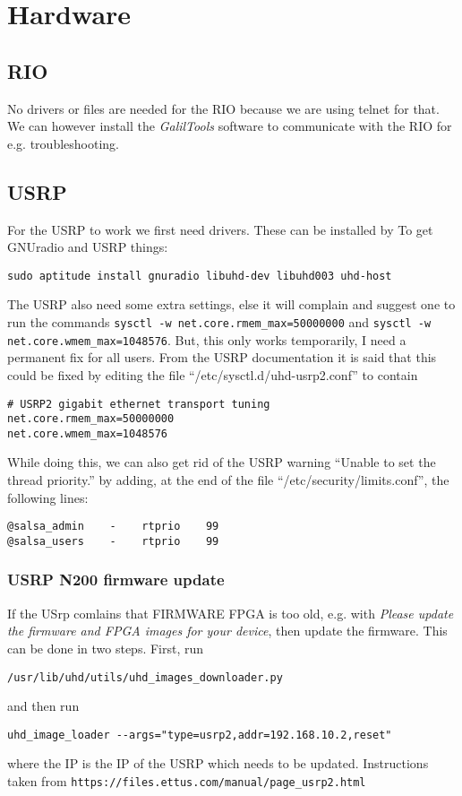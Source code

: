 \section{Hardware}
\subsection{RIO}
No drivers or files are needed for the RIO because we are using telnet for
that. We can however install the \emph{GalilTools} software to communicate
with the RIO for e.g. troubleshooting.

\subsection{USRP}
For the USRP to work we first need drivers. These can be installed by
To get GNUradio and USRP things: 
\begin{verbatim}
sudo aptitude install gnuradio libuhd-dev libuhd003 uhd-host
\end{verbatim}

The USRP also need some extra settings, else it will complain and suggest one
to run the commands 
\verb!sysctl -w net.core.rmem_max=50000000! and 
\verb!sysctl -w net.core.wmem_max=1048576!. But, this only works
temporarily, I need a permanent fix for all users. From the USRP documentation
it is said that this could be fixed by editing the file
“/etc/sysctl.d/uhd-usrp2.conf” to contain
\begin{verbatim}
# USRP2 gigabit ethernet transport tuning
net.core.rmem_max=50000000
net.core.wmem_max=1048576
\end{verbatim}
While doing this, we can also get rid of the USRP warning “Unable to set the
thread priority.” by adding, at the end of the file
“/etc/security/limits.conf”, the following lines: 
\begin{verbatim}
@salsa_admin    -    rtprio    99
@salsa_users    -    rtprio    99
\end{verbatim}

\subsubsection{USRP N200 firmware update}
If the USrp comlains that FIRMWARE FPGA is too old, e.g. with \emph{Please update the firmware and FPGA images for your device}, then update the firmware. This can be done in two steps. First, run
\begin{verbatim}
/usr/lib/uhd/utils/uhd_images_downloader.py
\end{verbatim}
and then run 
\begin{verbatim}
uhd_image_loader --args="type=usrp2,addr=192.168.10.2,reset"
\end{verbatim}
where the IP is the IP of the USRP which needs to be updated. Instructions
taken from \verb!https://files.ettus.com/manual/page_usrp2.html!
